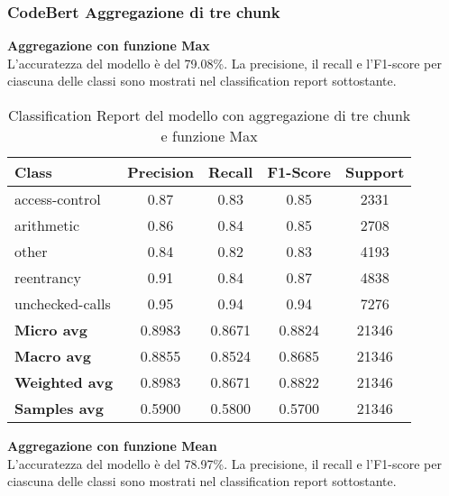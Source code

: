 \documentclass[../../Thesis.tex]{subfiles}
\begin{document}
\subsubsection{CodeBert Aggregazione di tre chunk}
\textbf{Aggregazione con funzione Max}\\
L'accuratezza del modello è del 79.08\%. La precisione, il recall e l'F1-score per ciascuna delle classi sono mostrati nel classification report sottostante.
\begin{table}[H]
    \centering
    \small
    \begin{tabular}{lcccc}
    \hline
    \textbf{Class} & \textbf{Precision} & \textbf{Recall} & \textbf{F1-Score} & \textbf{Support} \\
    \hline
    access-control & 0.87 & 0.83 & 0.85 & 2331 \\
    arithmetic & 0.86 & 0.84 & 0.85 & 2708 \\
    other & 0.84 & 0.82 & 0.83 & 4193 \\
    reentrancy & 0.91 & 0.84 & 0.87 & 4838 \\
    unchecked-calls & 0.95 & 0.94 & 0.94 & 7276 \\
    \hline
    \textbf{Micro avg} & 0.8983 & 0.8671 & 0.8824 & 21346 \\
    \textbf{Macro avg} & 0.8855 & 0.8524 & 0.8685 & 21346 \\
    \textbf{Weighted avg} & 0.8983 & 0.8671 & 0.8822 & 21346 \\
    \textbf{Samples avg} & 0.5900 & 0.5800 & 0.5700 & 21346 \\
    \hline
    \end{tabular}
    \caption{Classification Report del modello con aggregazione di tre chunk e funzione Max}
    \end{table}
    

\textbf{Aggregazione con funzione Mean}\\
L'accuratezza del modello è del 78.97\%. La precisione, il recall e l'F1-score per ciascuna delle classi sono mostrati nel classification report sottostante.
\end{document}
